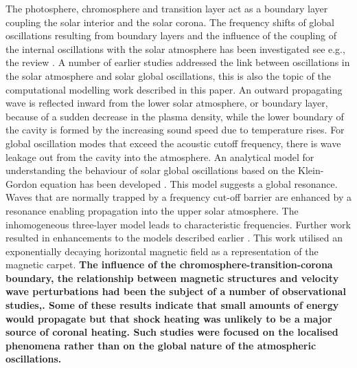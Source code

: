\documentclass[physics,article,submit,pdftex,moreauthors]{Definitions/mdpi}
\begin{document}
 The photosphere, chromosphere and transition layer act as a boundary layer coupling the solar interior and the solar corona. The frequency shifts of global oscillations resulting  from boundary layers   and the influence of the coupling of the internal oscillations with the solar atmosphere has been investigated see e.g., the review \cite{Erdelyi2006}.  A number of earlier studies addressed the link between oscillations in the solar atmosphere and solar global oscillations,  this is also the topic of the computational modelling work described in this paper. An outward propagating wave is reflected inward from the lower solar atmosphere, or boundary layer, because of a sudden decrease in the plasma density, while the lower boundary of the cavity is formed by the increasing sound speed due to temperature rises. For global oscillation modes that exceed the acoustic cutoff frequency, there is wave leakage out from the cavity into the atmosphere. An analytical model for understanding the behaviour of solar global oscillations based on the Klein-Gordon equation has been  developed \cite{Taroyan2008}. This model suggests a global resonance. Waves  that are normally trapped by a frequency cut-off barrier are enhanced by a resonance enabling propagation into the upper solar atmosphere. The inhomogeneous three-layer model leads to characteristic frequencies. Further work resulted in enhancements to the models described earlier \cite{Pinter2007}.  This work utilised an exponentially decaying horizontal magnetic field as a representation of the magnetic carpet. {\bf The influence of the chromosphere-transition-corona boundary, the relationship between magnetic structures and velocity wave perturbations had been the subject of a number of observational studies\cite{Mein1976},\cite{Schmieder1980}. Some of these results indicate that small amounts of energy would propagate but that shock heating was unlikely to be a major source of coronal heating. Such studies were focused on the localised phenomena rather than on the global nature of the atmospheric oscillations.  }
 
\end{document}
